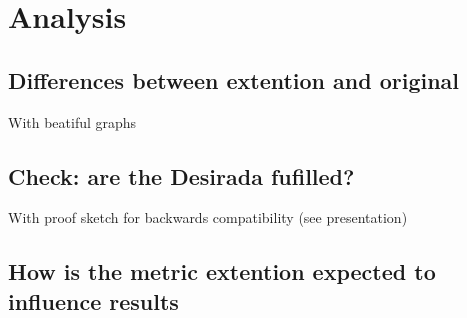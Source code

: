 \section{Analysis}
\subsection{Differences between extention and original}
With beatiful graphs
\subsection{Check: are the Desirada fufilled?}
With proof sketch for backwards compatibility (see presentation)
\subsection{How is the metric extention expected to influence results}
